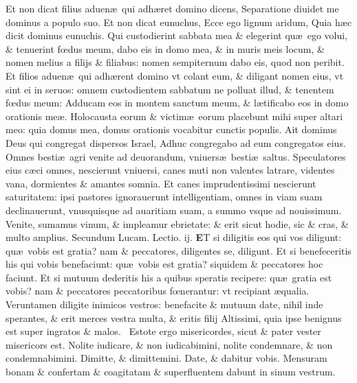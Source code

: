 \documentclass[a5paper,10pt]{book}
\def\leftmarginnote{%
	\lrmarginnote{\hskip -\marginparsep \hskip -6.5em}}
\def\rightmarginnote{%
	\lrmarginnote{\hskip\columnwidth \hskip -1em}}
\def\ae{æ}
\def\oe{œ}
\begin{document}
\begin{multicols*}{2}
Et non dicat filius aduen\ae \ qui adh\ae ret domino dicens, Separatione diuidet me dominus a populo suo.
Et non dicat eunuchus, Ecce ego lignum aridum, Quia h\ae c dicit dominus eunuchis.
Qui custodierint sabbata mea \& elegerint qu\ae \ ego volui, \& tenuerint f\oe dus meum, dabo eis in domo mea, \& in muris meis locum, \& nomen melius a filijs \& filiabus: nomen sempiternum dabo eis, quod non peribit.
Et filios aduen\ae \ qui adh\ae rent domino vt colant eum, \& diligant nomen eius, vt sint ei in seruos: omnem custodientem sabbatum ne polluat illud, \& tenentem f\oe dus meum: Adducam eos in montem sanctum meum, \& l\ae tificabo eos in domo orationis me\ae .
Holocausta eorum \& victim\ae \ eorum placebunt mihi super altari meo: quia domus mea, domus orationis vocabitur cunctis populis.
Ait dominus Deus qui congregat dispersos Israel, Adhuc congregabo ad eum congregatos eius.
Omnes besti\ae \ agri venite ad deuorandum, vniuers\ae \ besti\ae \ saltus.
Speculatores eius c\ae ci omnes, nescierunt vniuersi, canes muti non valentes latrare, videntes vana, dormientes \& amantes somnia.
Et canes imprudentissimi nescierunt saturitatem: ipsi pastores ignorauerunt intelligentiam, omnes in viam suam declinauerunt, vnusquisque ad auaritiam suam, a summo vsque ad nouissimum.
Venite, sumamus vinum, \& impleamur ebrietate: \& erit sicut hodie, sic \& cras, \& multo amplius.
\newline \color{red} Secundum Lucam. \hfill Lectio. ij. \color{black}
\vspace{-.25em}
\lettrine[lines=2]{\bfseries \color{red} E}{}T\rightmarginnote{ca. 6.} si diligitis eos qui vos diligunt: qu\ae \ vobis est gratia? nam \& peccatores, diligentes se, diligunt.
Et si benefeceritis his qui vobis benefaciunt: qu\ae \ vobis est gratia? siquidem \& peccatores hoc faciunt.
Et si mutuum dederitis his a quibus speratis recipere: qu\ae \ gratia est vobis? nam \& peccatores peccatoribus f\oe nerantur: vt recipiant \ae qualia.
Veruntamen diligite inimicos vestros: benefacite \& mutuum date, nihil inde sperantes, \& erit merces vestra multa, \& eritis filij Altissimi, quia ipse benignus est super ingratos \& malos.
\textdagger \ Estote\leftmarginnote{\begin{flushright}D\end{flushright}} ergo misericordes, sicut \& pater vester misericors est.
Nolite iudicare, \& non iudicabimini, nolite condemnare, \& non condemnabimini. Dimitte, \& dimittemini.
Date, \& dabitur vobis. Mensuram bonam \& confertam \& coagitatam \& superfluentem dabunt in sinum vestrum.

\end{multicols*}
\end{document}
